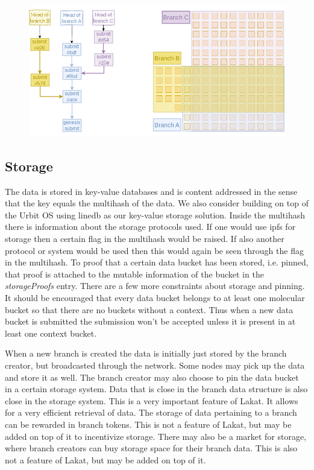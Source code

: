 \documentclass[14pt]{article}
\begin{document}
\begin{figure}[b!]
  \begin{center}
    \includegraphics[width=1.0\textwidth]{src/img/BranchBucketRelationV2.png}
\end{center}
 \caption{}
 \label{fig:branchbucketrel}
\end{figure}

\subsection{Storage}
\label{ssc:storage}

The data is stored in key-value databases and is content addressed in the sense that the key equals the multihash of the data. We also consider building on top of the Urbit OS using linedb\cite{linedb} as our key-value storage solution. Inside the multihash there is information about the storage protocols used. If one would use ipfs for storage then a certain flag in the multihash would be raised. If also another protocol or system would be used then this would again be seen through the flag in the multihash. To proof that a certain data bucket has been stored, i.e. pinned, that proof is attached to the mutable information of the bucket in the \textit{storageProofs} entry. There are a few more constraints about storage and pinning. It should be encouraged that every data bucket belongs to at least one molecular bucket so that there are no buckets without a context. Thus when a new data bucket is submitted the submission won't be accepted unless it is present in at least one context bucket.

When a new branch is created the data is initially just stored by the branch creator, but broadcasted through the network. Some nodes may pick up the data and store it as well. The branch creator may also choose to pin the data bucket in a certain storage system. Data that is close in the branch data structure is also close in the storage system. This is a very important feature of Lakat. It allows for a very efficient retrieval of data. The storage of data pertaining to a branch can be rewarded in branch tokens. This is not a feature of Lakat, but may be added on top of it to incentivize storage. There may also be a market for storage, where branch creators can buy storage space for their branch data. This is also not a feature of Lakat, but may be added on top of it.
\end{document}
